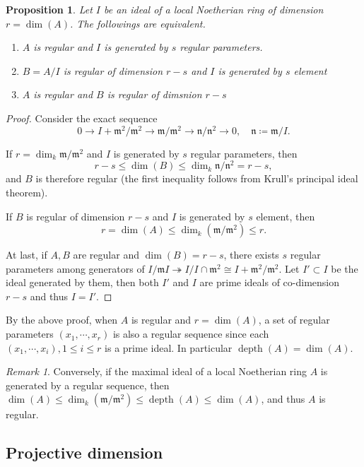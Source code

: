 \documentclass[leqno]{amsart}
\DeclareMathOperator{\depth}{depth}
\newcommand{\1}{\mathbf{1}}
\newcommand{\fm}{\mathfrak m}
\newcommand{\fn}{\mathfrak n}
\newtheorem{prop}[thm]{Proposition}
\theoremstyle{definition}
\theoremstyle{remark}
\newtheorem{rem}[thm]{Remark}
\begin{document}
\begin{prop}\label{prop:regular}
	Let  $I$ be an ideal of a local Noetherian ring 
	of dimension  $r=\dim(A)$.
	The followings are equivalent.
\begin{enumerate}[label=(\alph*)]
	\item 
	$A$ is regular and 
	$I$ is generated by $s$ regular parameters.
	\item  
	$B=A/I$ is regular of dimension  $r-s$
	and $I$ is generated by  $s$ element
	\item  
	$A$ is regular and  $B$ is regular of dimsnion  $r-s$
\end{enumerate}
\end{prop}
\begin{proof}
	Consider the exact sequence
	\[
		0\to I+\fm^2/\fm^2\to \fm/\fm^2\to \fn/\fn^2\to 0,\quad
		\fn\coloneqq \fm/I.
	\]
	
	If  $r=\dim_k\fm/\fm^2$ and 
	$I$ is generated by $s$ regular parameters, then
	\[
		r-s\leq \dim(B)\leq \dim_k \fn/\fn^2=r-s,
	\]
	and $B$ is therefore regular
	(the first inequality follows from Krull's principal
	ideal theorem).

	If $B$ is regular of dimension  $r-s$
	and $I$ is generated by  $s$ element, then
	\[
		r=\dim(A)\leq \dim_k(\fm/\fm^2)\leq r.
	\]

	At last, if $A, B$ are regular and $\dim(B)=r-s$,
	there exists $s$ regular parameters among generators of
	$I/\fm I\twoheadrightarrow I/I\cap \fm^2\cong I+\fm^2/\fm^2$.
	Let $I'\subset I$ be the ideal generated by them,
	then both $I'$ and  $I$ are prime ideals 
	of co-dimension  $r-s$ and thus  $I=I'$.
\end{proof}
By the above proof, when $A$ is regular and  $r=\dim(A)$,
a set of regular parameters  $(x_1,\cdots,x_r)$
is also a regular sequence since each 
$(x_1,\cdots,x_i), 1\leq i\leq r$ is a prime ideal.
In particular $\depth(A)=\dim(A)$.
\begin{rem}
Conversely, if the maximal ideal of a local Noetherian ring $A$	
is generated by a regular sequence, then
$\dim(A)\leq \dim_k(\fm/\fm^2)\leq \depth(A)\leq \dim(A)$,
and thus  $A$ is regular.
\end{rem}


\subsection{Projective dimension}
\end{document}

